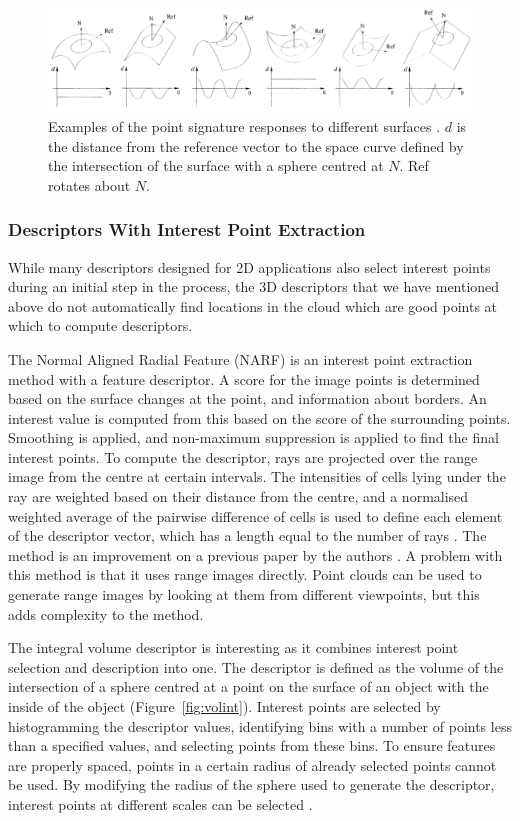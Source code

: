 \documentclass[11pt,a4paper]{kth-mag}
\begin{document}
\begin{figure}
  \centering
  \includegraphics[width=\textwidth]{images/pointsig}
  \caption{Examples of the point signature responses to different surfaces
    \cite{chua1997point}. $d$ is the distance from the reference vector to the
    space curve defined by the intersection of the surface with a sphere centred
    at $N$. Ref rotates about $N$.}
  \label{fig:pointsig}
\end{figure}

\subsubsection{Descriptors With Interest Point Extraction}
While many descriptors designed for 2D applications also select interest points
during an initial step in the process, the 3D descriptors that we have mentioned
above do not automatically find locations in the cloud which are good points at
which to compute descriptors.

The Normal Aligned Radial Feature (NARF) is an interest point extraction method
with a feature descriptor. A score for the image points is determined based on
the surface changes at the point, and information about borders. An interest
value is computed from this based on the score of the surrounding points.
Smoothing is applied, and non-maximum suppression is applied to find the final
interest points. To compute the descriptor, rays are projected over the range
image from the centre at certain intervals. The intensities of cells lying under
the ray are weighted based on their distance from the centre, and a normalised
weighted average of the pairwise difference of cells is used to define each
element of the descriptor vector, which has a length equal to the number of rays
\cite{steder2011point}. The method is an improvement on a previous paper by the
authors \cite{steder2009robust}. A problem with this method is that it uses
range images directly. Point clouds can be used to generate range images by
looking at them from different viewpoints, but this adds complexity to the
method.

The integral volume descriptor is interesting as it combines interest point
selection and description into one. The descriptor is defined as the volume of
the intersection of a sphere centred at a point on the surface of an object with
the inside of the object (Figure~\ref{fig:volint}). Interest points are selected
by histogramming the descriptor values, identifying bins with a number of points
less than a specified values, and selecting points from these bins. To ensure
features are properly spaced, points in a certain radius of already selected
points cannot be used. By modifying the radius of the sphere used to generate
the descriptor, interest points at different scales can be selected
\cite{gelfand2005robust}.
\end{document}
